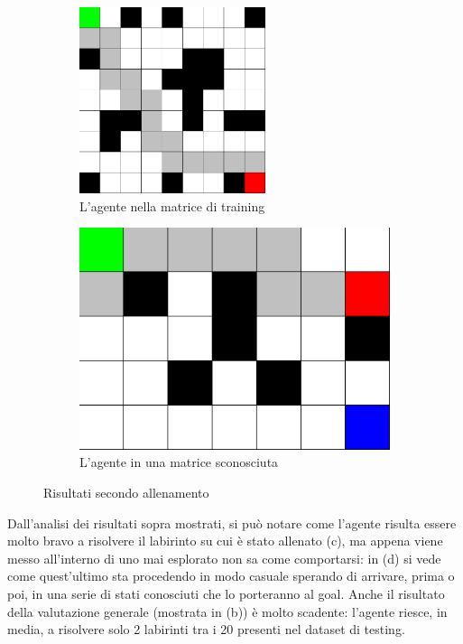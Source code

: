 \begin{figure}[H]
	\ \\
	\begin{subfigure}[t]{.5\textwidth}
		\centering
		\includegraphics[width=0.6\textwidth]{img/secondo_train_success.png}
		\caption{L'agente nella matrice di training}
	\end{subfigure}%
	\begin{subfigure}[t]{.5\textwidth}
		\centering
		\includegraphics[width=.8\textwidth]{img/secondo_train_fail.png}
		\caption{L'agente in una matrice sconosciuta}
	\end{subfigure}%
	\caption{Risultati secondo allenamento}
\end{figure}

Dall'analisi dei risultati sopra mostrati, si pu\`{o} notare come l'agente risulta essere molto bravo a risolvere il labirinto su cui \`{e} stato allenato (c), ma appena viene messo all'interno di uno mai esplorato non sa come comportarsi: in (d) si vede come quest'ultimo sta procedendo in modo casuale sperando di arrivare, prima o poi, in una serie di stati conosciuti che lo porteranno al goal. Anche il risultato della valutazione generale (mostrata in (b)) \`{e} molto scadente: l'agente riesce, in media, a risolvere solo 2 labirinti tra i 20 presenti nel dataset di testing.%
\pagebreak
